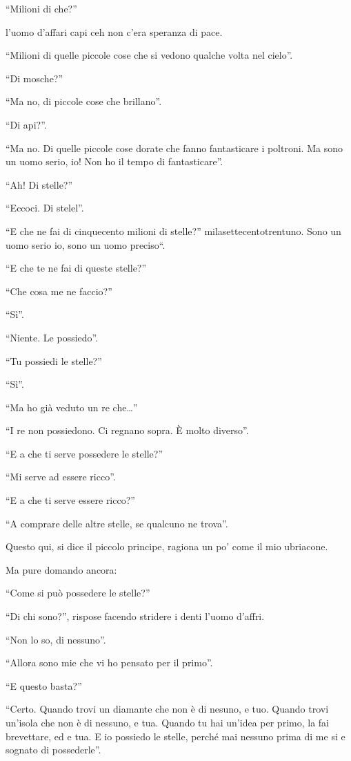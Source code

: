 \documentclass[11pt]{scrbook}
\begin{document}
``Milioni di che?''

l'uomo d'affari capi ceh non c'era speranza di pace.

``Milioni di quelle piccole cose che si vedono qualche volta nel
cielo''.

``Di mosche?''

``Ma no, di piccole cose che brillano''.

``Di api?''.

``Ma no. Di quelle piccole cose dorate che fanno fantasticare i
poltroni. Ma sono un uomo serio, io! Non ho il tempo di fantasticare''.

``Ah! Di stelle?''

``Eccoci. Di stelel''.

``E che ne fai di cinquecento milioni di stelle?''
milasettecentotrentuno. Sono un uomo serio io, sono un uomo preciso``.

``E che te ne fai di queste stelle?''

``Che cosa me ne faccio?''

``Sì''.

``Niente. Le possiedo''.

``Tu possiedi le stelle?''

``Sì''.

``Ma ho già veduto un re che\ldots{}''

``I re non possiedono. Ci regnano sopra. È molto diverso''.

``E a che ti serve possedere le stelle?''

``Mi serve ad essere ricco''.

``E a che ti serve essere ricco?''

``A comprare delle altre stelle, se qualcuno ne trova''.

Questo qui, si dice il piccolo principe, ragiona un po' come il mio
ubriacone.

Ma pure domando ancora:

``Come si può possedere le stelle?''

``Di chi sono?'', rispose facendo stridere i denti l'uomo d'affri.

``Non lo so, di nessuno''.

``Allora sono mie che vi ho pensato per il primo''.

``E questo basta?''

``Certo. Quando trovi un diamante che non è di nesuno, e tuo. Quando
trovi un'isola che non è di nessuno, e tua. Quando tu hai un'idea per
primo, la fai brevettare, ed e tua. E io possiedo le stelle, perché mai
nessuno prima di me si e sognato di possederle''.
\end{document}
